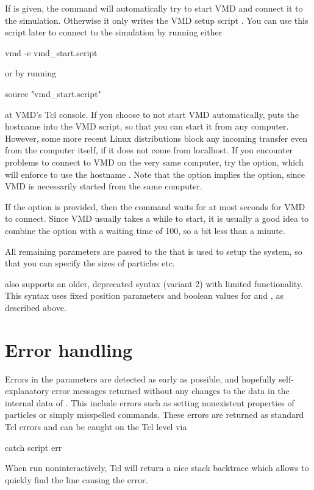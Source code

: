 If  is given, the command will automatically try to start VMD and connect it to the \es{} simulation.  Otherwise it only writes the VMD
setup script . You can use this script later to connect to the \es{} simulation by running either
\begin{code}
  vmd -e vmd_start.script
\end{code}
or by running
\begin{code}
  source "vmd\_start.script"
\end{code}
at VMD's Tcl console. If you choose to not start VMD automatically,
 puts the hostname into the VMD script, so
that you can start it from any computer. However, some more recent Linux
distributions block any incoming transfer even from the computer itself,
if it does not come from localhost. If you encounter problems to connect
to VMD on the very same computer, try the  option, which
will enforce to use the hostname . Note that the  option implies the  option, since VMD is
necessarily started from the same computer.

If the option  is provided, then the command waits for at most
 seconds for VMD to connect. Since VMD usually takes a while
to start, it is usually a good idea to combine the  option with a waiting time of 100, so a bit less than a minute.

All remaining parameters are passed to the  that is used
to setup the system, so that you can specify the sizes of particles etc.

 also supports an older, deprecated syntax (variant 2) with limited functionality. This syntax uses fixed position
parameters and boolean values for  and , as
described above.




\section{Error handling}
Errors in the parameters are detected as early as possible, and
hopefully self-explanatory error messages returned without any changes
to the data in the internal data of \es. This include errors such as
setting nonexistent properties of particles or simply misspelled
commands. These errors are returned as standard Tcl errors and can be
caught on the Tcl level via
\begin{tclcode}
catch {script} err 
\end{tclcode}
When run noninteractively, Tcl will return a nice stack backtrace
which allows to quickly find the line causing the error.

